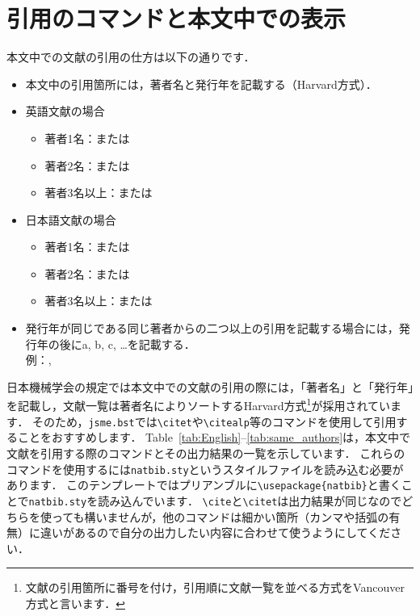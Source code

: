 \documentclass[a4paper,fleqn,uplatex,dvipdfmx]{jsarticle}
\newcommand{\jsmefile}{\texttt{jsme.bst}}
\begin{document}
\section{引用のコマンドと本文中での表示}
\label{sec:cite}
本文中での文献の引用の仕方は以下の通りです．
\begin{itembox}[l]{}
    \begin{itemize}
        \item 本文中の引用箇所には，著者名と発行年を記載する（Harvard方式）．
        \item 英語文献の場合
        \begin{itemize}
            \item 著者1名：\citet{Reynolds:PhilTransRoySoc1883}または\citep{Reynolds:PhilTransRoySoc1883}
            \item 著者2名：\citet{Schmid:Springer2001}または\citep{Schmid:Springer2001}
            \item 著者3名以上：\citet{Berghout:JFM2020}または\citep{Berghout:JFM2020}
        \end{itemize}
        \item 日本語文献の場合
        \begin{itemize}
            \item 著者1名：\citet{塚原:ながれ2023}または\citep{塚原:ながれ2023}
            \item 著者2名：\citet{塚原:ながれ2015}または\citep{塚原:ながれ2015}
            \item 著者3名以上：\citet{塚原:伝熱2007}または\citep{塚原:伝熱2007}
        \end{itemize}
        \item 発行年が同じである同じ著者からの二つ以上の引用を記載する場合には，発行年の後にa, b, c, \ldots を記載する． \\
        例：\citet{Matsukawa:ICFD2022}, \citet{松川:東北大SENAC2022}
\end{itemize}
\end{itembox}

日本機械学会の規定では本文中での文献の引用の際には，「著者名」と「発行年」を記載し，文献一覧は著者名によりソートするHarvard方式\footnote{文献の引用箇所に番号を付け，引用順に文献一覧を並べる方式をVancouver方式と言います．}が採用されています．
そのため，\jsmefile では\verb|\citet|や\verb|\citealp|等のコマンドを使用して引用することをおすすめします．
Table~\ref{tab:English}--\ref{tab:same_authors}は，本文中で文献を引用する際のコマンドとその出力結果の一覧を示しています．
これらのコマンドを使用するには\verb|natbib.sty|というスタイルファイルを読み込む必要があります．
このテンプレートではプリアンブルに\verb|\usepackage{natbib}|と書くことで\verb|natbib.sty|を読み込んでいます．
\verb|\cite|と\verb|\citet|は出力結果が同じなのでどちらを使っても構いませんが，他のコマンドは細かい箇所（カンマや括弧の有無）に違いがあるので自分の出力したい内容に合わせて使うようにしてください．
\end{document}
